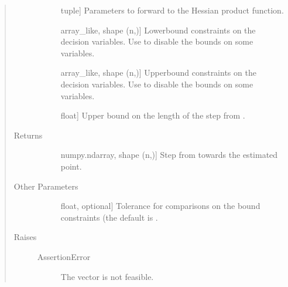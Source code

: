 \documentclass[letterpaper,10pt,english]{sphinxmanual}
\begin{document}
\begin{fulllineitems}
\begin{quote}
\begin{description}
\begin{description}
\item[{}] \leavevmode{[}tuple{]}
\sphinxAtStartPar
Parameters to forward to the Hessian product function.

\item[{}] \leavevmode{[}array\_like, shape (n,){]}
\sphinxAtStartPar
Lower\sphinxhyphen{}bound constraints on the decision variables. Use  to
disable the bounds on some variables.

\item[{}] \leavevmode{[}array\_like, shape (n,){]}
\sphinxAtStartPar
Upper\sphinxhyphen{}bound constraints on the decision variables. Use  to
disable the bounds on some variables.

\item[{}] \leavevmode{[}float{]}
\sphinxAtStartPar
Upper bound on the length of the step from .

\end{description}

\item[{Returns}] \leavevmode\begin{description}
\item[{}] \leavevmode{[}numpy.ndarray, shape (n,){]}
\sphinxAtStartPar
Step from  towards the estimated point.

\end{description}

\item[{Other Parameters}] \leavevmode\begin{description}
\item[{}] \leavevmode{[}float, optional{]}
\sphinxAtStartPar
Tolerance for comparisons on the bound constraints (the default is
.

\end{description}

\item[{Raises}] \leavevmode\begin{description}
\item[{AssertionError}] \leavevmode
\sphinxAtStartPar
The vector  is not feasible.

\end{description}


\end{description}
\end{quote}
\end{fulllineitems}
\end{document}
